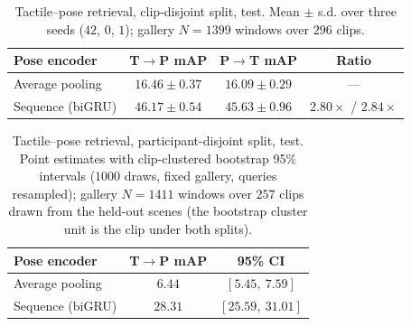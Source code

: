 \begin{table}[h]
\centering
\caption{Tactile--pose retrieval, clip-disjoint split, test. Mean $\pm$ s.d.
over three seeds ($42$, $0$, $1$); gallery $N=1399$ windows over $296$ clips.}
\label{tab:retrieval-clip}
\begin{tabular}{lccc}
\toprule
Pose encoder & T$\rightarrow$P mAP & P$\rightarrow$T mAP & Ratio \\
\midrule
Average pooling & $16.46 \pm 0.37$ & $16.09 \pm 0.29$ & --- \\
Sequence (biGRU) & $46.17 \pm 0.54$ & $45.63 \pm 0.96$ & $2.80\times$ / $2.84\times$ \\
\bottomrule
\end{tabular}
\end{table}

\begin{table}[h]
\centering
\caption{Tactile--pose retrieval, participant-disjoint split, test.
Point estimates with clip-clustered bootstrap 95\% intervals
($1000$ draws, fixed gallery, queries resampled); gallery $N=1411$ windows
over $257$ clips drawn from the held-out scenes (the bootstrap cluster unit
is the clip under both splits).}
\label{tab:retrieval-scene}
\begin{tabular}{lcc}
\toprule
Pose encoder & T$\rightarrow$P mAP & 95\% CI \\
\midrule
Average pooling & $6.44$ & $[5.45,\ 7.59]$ \\
Sequence (biGRU) & $28.31$ & $[25.59,\ 31.01]$ \\
\bottomrule
\end{tabular}
\end{table}

